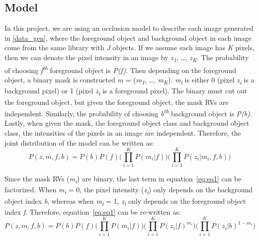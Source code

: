 \documentclass{article} %
\begin{document}
\subsection{Model}
\label{model}
In this project, we are using an occlusion model to describe each image generated in \ref{data_gen}, where the foreground object and background object in each image come from the same library with \textit{J} objects. If we assume each image has \textit{K} pixels, then we can denote the pixel intensity in an image by \textit{z}\textsubscript{\textit{1}}, \ldots , \textit{z}\textsubscript{\textit{K}}. The probability of choosing \textit{f}\textsuperscript{\textit{th}} foreground object is \textit{P(f)}. Then depending on the foreground object, a binary mask is constructed \textit{m} = (\textit{m}\textsubscript{\textit{1}}, \ldots, \textit{m}\textsubscript{\textit{K}}). \textit{m}\textsubscript{\textit{i}} is either 0 (pixel \textit{z}\textsubscript{\textit{i}} is a background pixel) or 1 (pixel \textit{z}\textsubscript{\textit{i}} is a foreground pixel). The binary must cut out the foreground object, but given the foreground object, the mask RVs are independent. Similarly, the probability of choosing \textit{b}\textsuperscript{\textit{th}} background object is \textit{P(b)}. Lastly, when given the mask, the foreground object class and background object class, the intensities of the pixels in an image are independent. Therefore, the joint distribution of the model can be written as:
\begin{equation}
P(z,m,f,b) = P(b)P(f)\Bigg( \prod_{i=1}^KP(m_{i}|f)\Bigg)\Bigg( \prod_{i=1}^KP(z_{i}|m_{i},f,b)\Bigg)
\label{eq:eq1}
\end{equation}

Since the mask RVs (\textit{m}\textsubscript{\textit{i}}) are binary, the last term in equation~\ref{eq:eq1} can be factorized. When \textit{m}\textsubscript{\textit{i}} = 0, the pixel intensity (\textit{z}\textsubscript{\textit{i}}) only depends on the background object index \textit{b}, whereas when \textit{m}\textsubscript{\textit{i}} = 1, \textit{z}\textsubscript{\textit{i}} only depends on the foreground object index \textit{f}. Therefore, equation~\ref{eq:eq1} can be re-written as:
\begin{equation}
P(z,m,f,b) = P(b)P(f)\Bigg( \prod_{i=1}^KP(m_{i}|f)\Bigg)\Bigg( \prod_{i=1}^KP(z_{i}|f)^{m_{i}}\Bigg)\Bigg( \prod_{i=1}^KP(z_{i}|b)^{1-m_{i}}\Bigg)
\label{eq:eq2}
\end{equation}
\end{document}
